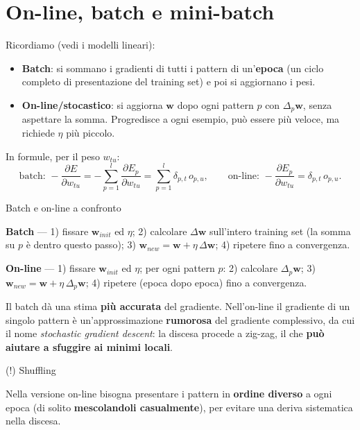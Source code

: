 \section{On-line, batch e mini-batch}\label{on-line-batch-e-mini-batch}

Ricordiamo (vedi i modelli lineari):

\begin{itemize}
\tightlist
\item
  \textbf{Batch}: si sommano i gradienti di tutti i pattern di
  un'\textbf{epoca} (un ciclo completo di presentazione del training
  set) e poi si aggiornano i pesi.
\item
  \textbf{On-line/stocastico}: si aggiorna \(\mathbf{w}\) dopo ogni
  pattern \(p\) con \(\Delta_p\mathbf{w}\), senza aspettare la somma.
  Progredisce a ogni esempio, può essere più veloce, ma richiede
  \(\eta\) più piccolo.
\end{itemize}

In formule, per il peso \(w_{tu}\): \[
\text{batch: } -\frac{\partial E}{\partial w_{tu}} = -\sum_{p=1}^{l}\frac{\partial E_p}{\partial w_{tu}} = \sum_{p=1}^{l}\delta_{p,t}\,o_{p,u}, \qquad \text{on-line: } -\frac{\partial E_p}{\partial w_{tu}} = \delta_{p,t}\,o_{p,u}.
\]

\begin{boxabstract}{Batch e on-line a confronto}

\textbf{Batch} --- 1) fissare \(\mathbf{w}_{init}\) ed \(\eta\); 2)
calcolare \(\Delta\mathbf{w}\) sull'intero training set (la somma su
\(p\) è dentro questo passo); 3)
\(\mathbf{w}_{new} = \mathbf{w} + \eta\,\Delta\mathbf{w}\); 4) ripetere
fino a convergenza.

\textbf{On-line} --- 1) fissare \(\mathbf{w}_{init}\) ed \(\eta\); per
ogni pattern \(p\): 2) calcolare \(\Delta_p\mathbf{w}\); 3)
\(\mathbf{w}_{new} = \mathbf{w} + \eta\,\Delta_p\mathbf{w}\); 4)
ripetere (epoca dopo epoca) fino a convergenza.

\end{boxabstract}

Il batch dà una stima \textbf{più accurata} del gradiente. Nell'on-line
il gradiente di un singolo pattern è un'approssimazione
\textbf{rumorosa} del gradiente complessivo, da cui il nome
\emph{stochastic gradient descent}: la discesa procede a zig-zag, il che
\textbf{può aiutare a sfuggire ai minimi locali}.

\begin{boxtip}{(!) Shuffling}

Nella versione on-line bisogna presentare i pattern in \textbf{ordine
diverso} a ogni epoca (di solito \textbf{mescolandoli casualmente}), per
evitare una deriva sistematica nella discesa.

\end{boxtip}

